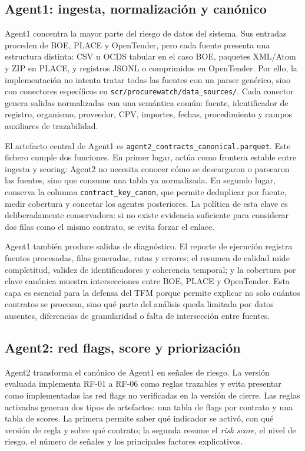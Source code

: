 \documentclass[11pt,a4paper,spanish]{book}
\numberwithin{equation}{chapter}
\numberwithin{figure}{chapter}
\begin{document}
\subsection{Agent1: ingesta, normalizaci{\'o}n y can{\'o}nico}

Agent1 concentra la mayor parte del riesgo de datos del sistema. Sus entradas proceden de BOE,
PLACE y OpenTender, pero cada fuente presenta una estructura distinta: CSV u OCDS tabular en el
caso BOE, paquetes XML/Atom y ZIP en PLACE, y registros JSONL o comprimidos en OpenTender. Por
ello, la implementaci{\'o}n no intenta tratar todas las fuentes con un parser gen{\'e}rico, sino con
conectores espec{\'i}ficos en \texttt{scr/procurewatch/data\_sources/}. Cada conector genera salidas
normalizadas con una sem{\'a}ntica com{\'u}n: fuente, identificador de registro, organismo, proveedor,
CPV, importes, fechas, procedimiento y campos auxiliares de trazabilidad.

El artefacto central de Agent1 es \texttt{agent2\_contracts\_canonical.parquet}. Este fichero cumple
dos funciones. En primer lugar, act{\'u}a como frontera estable entre ingesta y scoring: Agent2 no
necesita conocer c{\'o}mo se descargaron o parsearon las fuentes, sino que consume una tabla ya
normalizada. En segundo lugar, conserva la columna \texttt{contract\_key\_canon}, que permite
deduplicar por fuente, medir cobertura y conectar los agentes posteriores. La pol{\'i}tica de esta
clave es deliberadamente conservadora: si no existe evidencia suficiente para considerar dos filas
como el mismo contrato, se evita forzar el enlace.

Agent1 tambi{\'e}n produce salidas de diagn{\'o}stico. El reporte de ejecuci{\'o}n registra fuentes
procesadas, filas generadas, rutas y errores; el resumen de calidad mide completitud, validez de
identificadores y coherencia temporal; y la cobertura por clave can{\'o}nica muestra intersecciones
entre BOE, PLACE y OpenTender. Esta capa es esencial para la defensa del TFM porque permite explicar
no solo cu{\'a}ntos contratos se procesan, sino qu{\'e} parte del an{\'a}lisis queda limitada por datos
ausentes, diferencias de granularidad o falta de intersecci{\'o}n entre fuentes.

\subsection{Agent2: red flags, score y priorizaci{\'o}n}

Agent2 transforma el can{\'o}nico de Agent1 en se{\~n}ales de riesgo. La versi{\'o}n evaluada implementa
RF-01 a RF-06 como reglas trazables y evita presentar como implementadas las red flags no verificadas
en la versi{\'o}n de cierre. Las reglas activadas generan dos tipos de artefactos: una tabla de flags
por contrato y una tabla de scores. La primera permite saber qu{\'e} indicador se activ{\'o}, con qu{\'e}
versi{\'o}n de regla y sobre qu{\'e} contrato; la segunda resume el \textit{risk score}, el nivel de
riesgo, el n{\'u}mero de se{\~n}ales y los principales factores explicativos.
\end{document}

